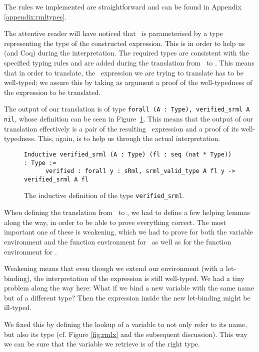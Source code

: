 \documentclass[11pt, leqno, titlepage]{article}
\def\coqe{\lstinline[language=Coq, basicstyle=\small]}
\theoremstyle{definition}
\begin{document}
The rules we implemented are straightforward and can be found in Appendix
\ref{appendix:rmltypes}. 

The attentive reader will have noticed that \srml\ is parameterised by a type
representing the type of the constructed expression. This is in order to help us (and
Coq) during the interpretation. The required types are consistent with the specified
typing rules and are added during the translation from \rmlx\ to \srml. 
This means that in order to translate, the \rmlx\ expression we are trying to
translate has to be well-typed; we assure this by taking as argument a proof of
the well-typedness of the expression to be translated.

The output of our translation is of type \coqe{forall (A : Type), verified_srml A nil},
whose definition can be seen in Figure~\ref{fig:verified-srml}. This means that the
output of our translation effectively is a pair of the resulting \srml\ expression
and a proof of its well-typedness. This, again, is to help us through the actual
interpretation. 

\begin{figure}[h]
  \centering
\begin{lstlisting}[language=coq]
  Inductive verified_srml (A : Type) (fl : seq (nat * Type)) : Type :=
      verified : forall y : sRml, srml_valid_type A fl y -> verified_srml A fl
\end{lstlisting}
  \caption{The inductive definition of the type \coqe{verified_srml}.}
  \label{fig:verified-srml}
\end{figure}

When defining the translation from \rmlx\ to \srml, we had to define a few helping
lemmas along the way, in order to be able to prove everything correct. The most
important one of these is weakening, which we had to prove for both the variable
environment and the function environment for \rmlx\ as well as for the function
environment for \srml.

Weakening means that even though we extend our environment (with a let-binding), the
interpretation of the expression is still well-typed.
We had a tiny problem along the way here: What if we bind a new variable with the
same name but of a different type? Then the expression inside the new let-binding
might be ill-typed.

We fixed this by defining the lookup of a variable to not only refer to its name, but
also its type (cf. Figure \ref{fig:rmlx} and the subsequent discussion). This way we
can be sure that the variable we retrieve is of the right type.  
\end{document}
